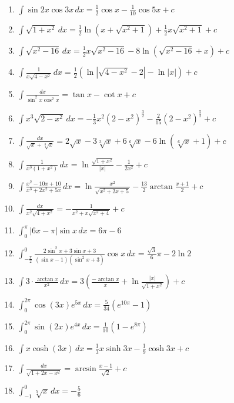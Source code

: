 \documentclass[11pt,a4paper]{article}
\begin{document}
\begin{enumerate}
\item $\displaystyle \int \sin 2x \cos 3x \, dx = \frac{1}{2}\cos x - \frac{1}{10}\cos 5x + c$
\item $\displaystyle \int \sqrt{1 + x^{2}} \, dx = \frac{1}{2}\ln\left(x + \sqrt{x^{2} + 1}\right) + \frac{1}{2}x\sqrt{x^{2} + 1} + c$
\item $\displaystyle \int \sqrt{x^{2} - 16} \, dx = \frac{1}{2}x\sqrt{x^{2} - 16} - 8\ln\left(\sqrt{x^{2} - 16} + x\right) + c$
\item $\displaystyle \int \frac{1}{x\sqrt{4 - x^{2}}} \, dx = \frac{1}{2}\left(\ln\left|\sqrt{4 - x^{2}} - 2\right| - \ln|x|\right) + c$
\item $\displaystyle \int \frac{dx}{\sin^{2} x \cos^{2} x} = \tan x - \cot x + c$
\item $\displaystyle \int x^{3}\sqrt{2 - x^{2}} \, dx = -\frac{1}{3}x^{2}\left(2 - x^{2}\right)^{\frac{3}{2}} - \frac{2}{15}\left(2 - x^{2}\right)^{\frac{5}{2}} + c$
\item $\displaystyle \int \frac{dx}{\sqrt{x} + \sqrt[3]{x}} = 2\sqrt{x} - 3\sqrt[3]{x} + 6\sqrt[6]{x} - 6\ln\left(\sqrt[6]{x} + 1\right) + c$
\item $\displaystyle \int \frac{1}{x^{3}\left(1 + x^{2}\right)} \, dx = \ln\frac{\sqrt{1 + x^{2}}}{|x|} - \frac{1}{2x^{2}} + c$
\item $\displaystyle \int \frac{x^{2} - 10x + 10}{x^{3} + 2x^{2} + 5x} \, dx = \ln\frac{x^{2}}{\sqrt{x^{2} + 2x + 5}} - \frac{13}{2}\arctan\frac{x + 1}{2} + c$
\item $\displaystyle \int \frac{dx}{x^{2}\sqrt{4 + x^{2}}} = -\frac{1}{x^{2} + x\sqrt{x^{2} + 4}} + c$
\item $\displaystyle \int_{0}^{\pi} |6x - \pi|\sin x \, dx = 6\pi - 6$
\item $\displaystyle \int_{-\frac{\pi}{2}}^{0} \frac{2\sin^{2} x + 3\sin x + 3}{(\sin x - 1)\left(\sin^{2} x + 3\right)}\cos x \, dx = \frac{\sqrt{3}}{6}\pi - 2\ln 2$
\item $\displaystyle \int 3 \cdot \frac{\arctan x}{x^{2}} \, dx = 3\left(\frac{-\arctan x}{x} + \ln\frac{|x|}{\sqrt{1 + x^{2}}}\right) + c$
\item $\displaystyle \int_{0}^{2\pi} \cos(3x) e^{5x} \, dx = \frac{5}{34}\left(e^{10\pi} - 1\right)$
\item $\displaystyle \int_{0}^{2\pi} \sin(2x) e^{4x} \, dx = \frac{1}{10}\left(1 - e^{8\pi}\right)$
\item $\displaystyle \int x\cosh\left(3x\right) \, dx = \frac{1}{3}x\sinh 3x - \frac{1}{9}\cosh 3x + c$
\item $\displaystyle \int \frac{dx}{\sqrt{1 + 2x - x^{2}}} = \arcsin\frac{x - 1}{\sqrt{2}} + c$
\item $\displaystyle \int_{-1}^{0} \sqrt[5]{x} \, dx = -\frac{5}{6}$
\end{enumerate}
\end{document}
